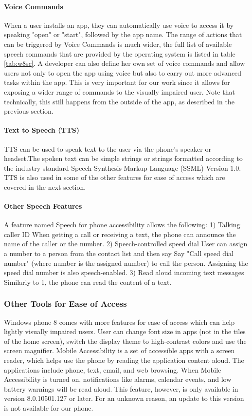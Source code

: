 \paragraph{Voice Commands}
When a user installs an app, they can automatically use voice to access it by speaking "open" or "start", followed by the app name. The range of actions that can be triggered by Voice Commands is much wider, the full list of available speech commands that are provided by the operating system is listed in table \ref{tab:w8sc}.
A developer can also define her own set of voice commands and allow users not only to open the app using voice but also to carry out more advanced tasks within the app. This is very important for our work since it allows for exposing a wider range of commands to the visually impaired user. Note that technically, this still happens from the outside of the app, as described in the previous section.

\paragraph{Text to Speech (TTS)}
TTS can be used to speak text to the user via the phone's speaker or headset.The spoken text can be simple strings or strings formatted according to the industry-standard Speech Synthesis Markup Language (SSML) Version 1.0. TTS is also used in some of the other features for ease of access which are covered in the next section.

\paragraph{Other Speech Features}
A feature named Speech for phone accessibility allows the following:
1)	Talking caller ID
When getting a call or receiving a text, the phone can announce the name of the caller or the number. 
2)	Speech-controlled speed dial
User can assign a number to a person from the contact list and then say Say "Call speed dial number" (where number is the assigned number) to call the person. Assigning the speed dial number is also speech-enabled.
3)	Read aloud incoming text messages
Similarly to 1, the phone can read the content of a text.

\subsubsection{Other Tools for Ease of Access}
Windows phone 8 comes with more features for ease of access which can help lightly visually impaired users. User can change font size in apps (not in the tiles of the home screen), switch the display theme to high-contrast colors and use the screen magnifier. Mobile Accessibility is a set of accessible apps with a screen reader, which helps use the phone by reading the application content aloud. The applications include phone, text, email, and web browsing. When Mobile Accessibility is turned on, notifications like alarms, calendar events, and low battery warnings will be read aloud. This feature, however, is only available in version 8.0.10501.127 or later. For an unknown reason, an update to this version is not available for our phone.


